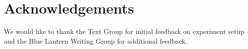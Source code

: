 \documentclass[11pt]{article}
\begin{document}
\nocite{Green2004,liwc_22,kuzmicova2014,brysbaert2014,Maslej2019TheTF,green_brock_kaufman_2006,Consoli2018,busselle2009,jacobs2018,jacobs2017,stockwell2002cognitive,HSU201596,willems_2015,mak2019,kunze2015,ferreira-goncalo-oliveira-2018-seeking,aryani2013,delatorre2019,andrade2020,indico2015,gerrig_1993,Magyari2020,valence_arousal_dominance_2013,Brysbaert_2015}





\section*{Acknowledgements}

We would like to thank the Text Group for initial feedback on experiment setup and the Blue Lantern Writing Group for additional feedback.
\end{document}
